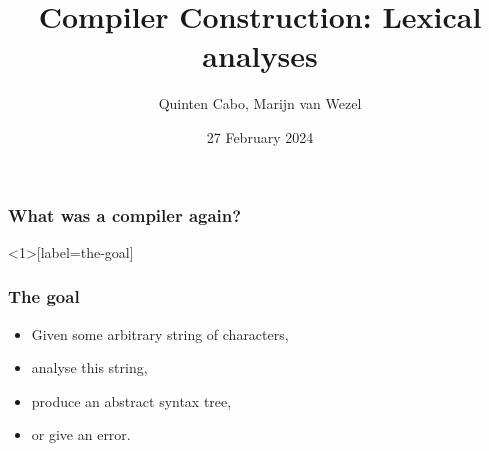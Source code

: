 \documentclass{beamer}
\title{\textbf{Compiler Construction: Lexical analyses}}
\author{Quinten Cabo, Marijn van Wezel}
\institute{Radboud University Nijmegen}
\date{27 February 2024}
\begin{document}

\frame{\titlepage}

\begin{frame}
  \frametitle{What was a compiler again?}
  
  \begin{center}
  \end{center}
\end{frame}

\begin{frame}<1>[label=the-goal]
  \frametitle{The goal}

  \begin{itemize}[<+->]
    \item \alert<1>{Given some arbitrary string of characters,}
    \item \alert<2>{analyse this string,}
    \item \alert<3>{produce an abstract syntax tree,}
    \item \alert<4>{or give an error.}
  \end{itemize}
\end{frame}
\end{document}
